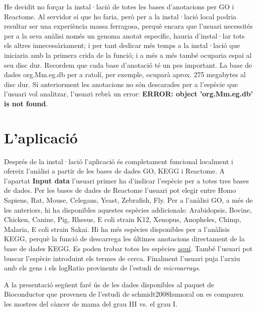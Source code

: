 He decidit no forçar la instal·lació de totes les bases d’anotacions per GO i Reactome. Al servidor sí que ho faria, però per a la instal·lació local podria resultar ser una experiència massa ferragosa, perquè encara que l’usuari necessités per a la seva anàlisi només un genoma anotat específic, hauria d’instal·lar tots els altres innecessàriament; i per tant dedicar més temps a la instal·lació que iniciaria amb la primera crida de la funció;  i a més a més també ocuparia espai al seu disc dur. Recordem que cada base d’anotació té un pes important. La base de dades org.Mm.eg.db per a ratolí, per exemple, ocuparà aprox. 275 megabytes al disc dur. Si anteriorment les anotacions no són descarades per a l’espècie que l’usuari vol analitzar, l’usuari rebrà un error: \textbf{ERROR: object 'org.Mm.eg.db’ is not found}.

\chapter{L'aplicació}

Després de la instal·lació l'aplicació és completament funcional localment i ofereix l'anàlisi a partir de les bases de dades \gls{GO}, \gls{KEGG} i Reactome. A l'apartat \textbf{Input data} l'usuari primer ha d'indicar l'espècie per a totes tres bases de dades. Per les bases de dades de Reactome l'usuari pot elegir entre Homo Sapiens, Rat, Mouse, Celegans, Yeast, Zebrafish, Fly. Per a l’anàlisi GO, a més de les anteriors, hi ha disponibles aquestes espècies addicionals: Arabidopsis, Bovine, Chicken, Canine, Pig, Rhesus, E coli strain K12, Xenopus, Anopheles, Chimp, Malaria, E coli strain Sakai. Hi ha més espècies disponibles per a l'anàlisis \gls{KEGG}, perquè la funció de   descarrega les últimes anotacions directament de la base de dades \gls{KEGG}. Es poden trobar totes les espècies \href{http://www.genome.jp/kegg/catalog/org_list.html}{aquí}. També l'usuari pot buscar l'espècie introduint els termes de cerca. Finalment l'usuari puja l'arxiu amb els gens i els \gls{logRatio} provinents de l'estudi de \textit{microarrays}. 

A la presentació següent faré ús de les dades disponibles al paquet  de \gls{Bioconductor} que provenen de l'estudi de schmidt2008humoral on es comparen les mostres del càncer de mama del grau III vs. el grau I. 


